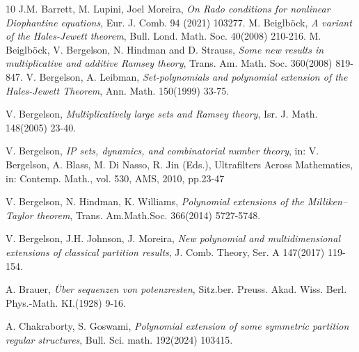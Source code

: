 \documentclass[12pt]{amsart}
\theoremstyle{plain}
\theoremstyle{definition}
\theoremstyle{remark}
\numberwithin{equation}{section}
\begin{document}

\begin{thebibliography}{10}
 J.M. Barrett, M. Lupini, Joel Moreira, \textit{On Rado conditions for nonlinear Diophantine equations}, Eur. J. Comb. 94 (2021) 103277.
\vspace{.3cm}
 M. Beiglb\"{o}ck, \textit{A variant of the Hales-Jewett theorem}, Bull. Lond. Math. Soc. 40(2008) 210-216.
\vspace{.3cm}
 M. Beiglb\"{o}ck,  V. Bergelson,  N. Hindman and D. Strauss, \textit{Some new results in multiplicative and additive Ramsey theory}, Trans. Am. Math. Soc. 360(2008) 819-847.
\vspace{.3cm}
 V. Bergelson, A. Leibman, \textit{Set-polynomials and polynomial extension of the Hales-Jewett Theorem}, Ann. Math. 150(1999) 33-75.

\vspace{.3cm}
 V. Bergelson, \textit{Multiplicatively large sets and Ramsey theory}, Isr. J. Math. 148(2005) 23-40.

\vspace{.3cm}

 V. Bergelson, \textit{IP sets, dynamics, and combinatorial number theory}, in: V. Bergelson, A. Blass, M. Di Nasso, R. Jin (Eds.), Ultrafilters Across Mathematics, in: Contemp. Math., vol. 530, AMS, 2010, pp.23-47

\vspace{.3cm}
 V. Bergelson, N. Hindman, K. Williams, \textit{Polynomial extensions of the Milliken--Taylor theorem}, Trans. Am.Math.Soc. 366(2014) 5727-5748.

\vspace{.3cm}
 V. Bergelson, J.H. Johnson, J. Moreira, \textit{New polynomial and multidimensional extensions of classical partition results}, J. Comb. Theory, Ser. A 147(2017) 119-154.

\vspace{.3cm}
 A. Brauer, \textit{\"{U}ber sequenzen von potenzresten}, Sitz.ber. Preuss. Akad. Wiss. Berl. Phys.-Math. KI.(1928) 9-16.

\vspace{.3cm}
 A. Chakraborty, S. Goswami, \textit{Polynomial extension of some symmetric partition
regular structures}, Bull. Sci. math. 192(2024) 103415.

\vspace{.3cm}


\end{thebibliography}
\end{document}
